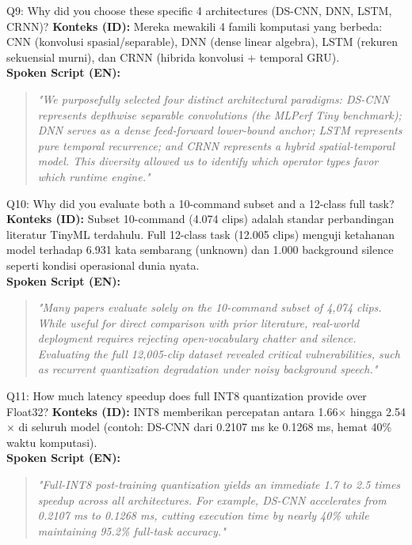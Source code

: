 \documentclass[11pt,a4paper]{article}
\begin{document}
\begin{mediumbox}{Q9: Why did you choose these specific 4 architectures (DS-CNN, DNN, LSTM, CRNN)?}
\textbf{Konteks (ID):} Mereka mewakili 4 famili komputasi yang berbeda: CNN (konvolusi spasial/separable), DNN (dense linear algebra), LSTM (rekuren sekuensial murni), dan CRNN (hibrida konvolusi + temporal GRU).\\
\textbf{Spoken Script (EN):}
\begin{quote}
\small
\textit{"We purposefully selected four distinct architectural paradigms: DS-CNN represents depthwise separable convolutions (the MLPerf Tiny benchmark); DNN serves as a dense feed-forward lower-bound anchor; LSTM represents pure temporal recurrence; and CRNN represents a hybrid spatial-temporal model. This diversity allowed us to identify which operator types favor which runtime engine."}
\end{quote}
\end{mediumbox}

\begin{mediumbox}{Q10: Why did you evaluate both a 10-command subset and a 12-class full task?}
\textbf{Konteks (ID):} Subset 10-command (4.074 clips) adalah standar perbandingan literatur TinyML terdahulu. Full 12-class task (12.005 clips) menguji ketahanan model terhadap 6.931 kata sembarang (unknown) dan 1.000 background silence seperti kondisi operasional dunia nyata.\\
\textbf{Spoken Script (EN):}
\begin{quote}
\small
\textit{"Many papers evaluate solely on the 10-command subset of 4,074 clips. While useful for direct comparison with prior literature, real-world deployment requires rejecting open-vocabulary chatter and silence. Evaluating the full 12,005-clip dataset revealed critical vulnerabilities, such as recurrent quantization degradation under noisy background speech."}
\end{quote}
\end{mediumbox}

\begin{mediumbox}{Q11: How much latency speedup does full INT8 quantization provide over Float32?}
\textbf{Konteks (ID):} INT8 memberikan percepatan antara 1.66$\times$ hingga 2.54$\times$ di seluruh model (contoh: DS-CNN dari 0.2107 ms ke 0.1268 ms, hemat 40\% waktu komputasi).\\
\textbf{Spoken Script (EN):}
\begin{quote}
\small
\textit{"Full-INT8 post-training quantization yields an immediate 1.7 to 2.5 times speedup across all architectures. For example, DS-CNN accelerates from 0.2107 ms to 0.1268 ms, cutting execution time by nearly 40\% while maintaining 95.2\% full-task accuracy."}
\end{quote}
\end{mediumbox}
\end{document}
